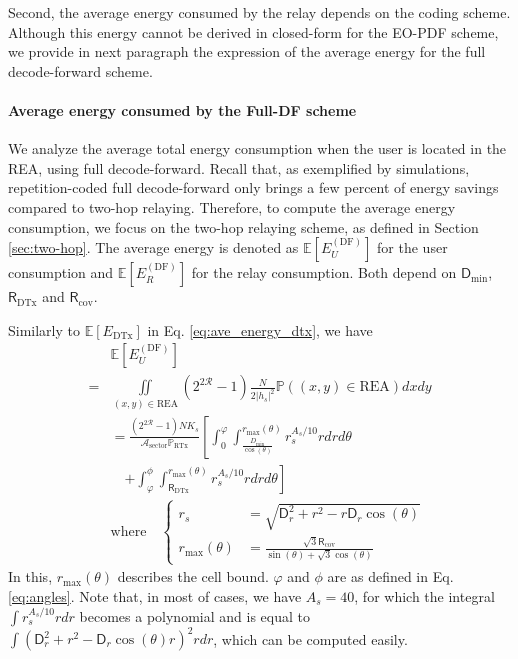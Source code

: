 \documentclass[journal]{IEEEtran}
\theoremstyle{definition}
\begin{document}
Second, the average energy consumed by the relay depends on the coding scheme. Although this energy cannot be derived in closed-form for the EO-PDF scheme, we provide in next paragraph the expression of the average energy for the full decode-forward scheme.

\paragraph*{Average energy consumed by the Full-DF scheme}

We analyze the average total energy consumption when the user is located in the REA, using full decode-forward. Recall that, as exemplified by simulations, repetition-coded full decode-forward only brings a few percent of energy savings compared to two-hop relaying. Therefore, to compute the average energy consumption, we focus on the two-hop relaying scheme, as defined in Section \ref{sec:two-hop}.
The average energy is denoted as $\mathbb{E} \left[E_{U}^{(\text{DF})}\right]$ for the user consumption and $\mathbb{E} \left[E_{R}^{(\text{DF})}\right]$ for the relay consumption. Both depend on $\mathsf{D}_{\min}$, $\mathsf{R}_{\text{DTx}}$ and $\mathsf{R}_{\text{cov}}$.

Similarly to $\mathbb{E} \left[E_{\text{DTx}}\right]$ in Eq. \eqref{eq:ave_energy_dtx}, we have 
\begin{align}
& \mathbb{E} \left[E_{U}^{(\text{DF})}\right] \nonumber 
\\
= & \underset{(x,y) \in \text{REA}}{\iint} \left(2^{2\mathcal{R}}-1\right) \frac{N}{2 \vert h_s \vert^2} \mathbb{P}\left((x,y) \in \text{REA}\right)  dx dy  \\
& = \frac{\left(2^{2\mathcal{R}}-1\right)N K_s } {\mathcal{A}_{\text{sector}} \mathbb{P}_{\text{RTx}}}
\left[ \int_0^{\varphi} \int_{\frac{ D_{\min}}{\cos(\theta)}} ^{r_{\max}\left( \theta \right)}  r_s^{A_s/10} r dr d\theta 
\nonumber \right. 
\\
& \quad  \left. 
\nonumber 
+ \int_\varphi^{\phi} \int_{\mathsf{R}_\text{DTx}}^{r_{\max}\left( \theta \right)} r_s^{A_s/10} r dr d\theta
\right]
\nonumber \\
& \text{where} \quad
\left\lbrace
\begin{array}{ll}
r_s &= \sqrt{\mathsf{D}_r^2 + r^2 - r\mathsf{D}_r \cos (\theta)} \\
r_{\max}\left( \theta \right) & =\frac{\sqrt{3}\mathsf{R}_{\text{cov}}}{\sin(\theta)+\sqrt{3}\cos(\theta)}
\end{array}
\right. \nonumber
\end{align}
In this, $r_{\max}\left( \theta \right) $ describes the cell bound. $\varphi$ and $\phi$ are as defined in Eq. \eqref{eq:angles}.
Note that, in most of cases, we have $A_s=40$, for which the integral $\int r_s^{A_s/10} r dr$ becomes a polynomial and is equal to $\int \left( \mathsf{D}_r^2 + r^2 - \mathsf{D}_r \cos (\theta) r  \right)^2 r dr $, which can be computed easily.
\end{document}

